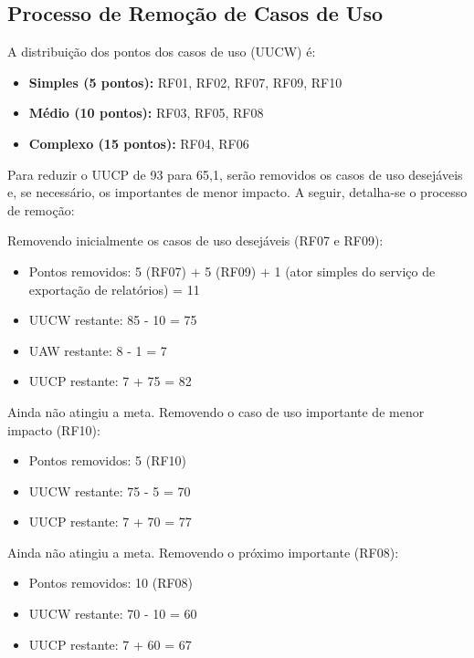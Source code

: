 \subsection{Processo de Remoção de Casos de Uso}

A distribuição dos pontos dos casos de uso (UUCW) é:

\begin{itemize}
    \item \textbf{Simples (5 pontos):} RF01, RF02, RF07, RF09, RF10
    \item \textbf{Médio (10 pontos):} RF03, RF05, RF08
    \item \textbf{Complexo (15 pontos):} RF04, RF06
\end{itemize}

Para reduzir o UUCP de 93 para 65,1, serão removidos os casos de uso desejáveis e, se necessário, os importantes de menor impacto. A seguir, detalha-se o processo de remoção:

Removendo inicialmente os casos de uso desejáveis (RF07 e RF09):

\begin{itemize}
    \item Pontos removidos: 5 (RF07) + 5 (RF09) + 1 (ator simples do serviço de exportação de relatórios) = 11
    \item UUCW restante: 85 - 10 = 75
    \item UAW restante: 8 - 1 = 7
    \item UUCP restante: 7 + 75 = 82
\end{itemize}

Ainda não atingiu a meta. Removendo o caso de uso importante de menor impacto (RF10):

\begin{itemize}
    \item Pontos removidos: 5 (RF10)
    \item UUCW restante: 75 - 5 = 70
    \item UUCP restante: 7 + 70 = 77
\end{itemize}

Ainda não atingiu a meta. Removendo o próximo importante (RF08):

\begin{itemize}
    \item Pontos removidos: 10 (RF08)
    \item UUCW restante: 70 - 10 = 60
    \item UUCP restante: 7 + 60 = 67
\end{itemize}

